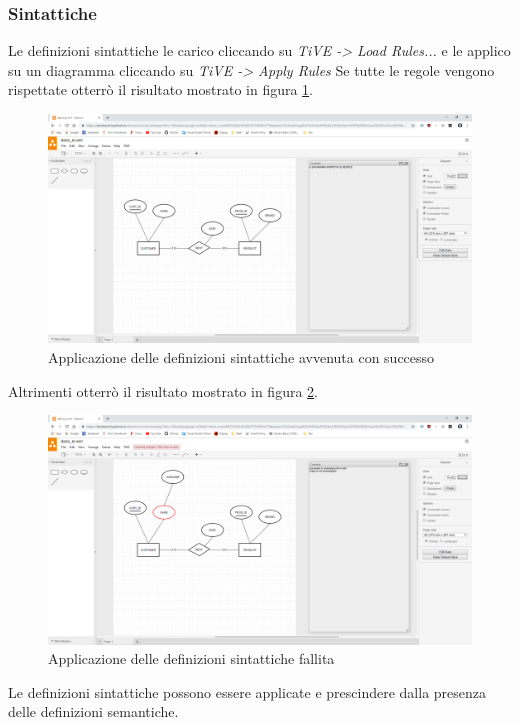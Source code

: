             \subsubsection{Sintattiche}
                Le definizioni sintattiche le carico cliccando su \textit{TiVE -> Load Rules...} e le applico su un diagramma cliccando su \textit{TiVE -> Apply Rules}
                \newline
                Se tutte le regole vengono rispettate otterrò il risultato mostrato in figura \ref{fig:syntaxOK}.
                \begin{figure}[htbp]
                    \centering
                    \includegraphics[scale=0.25]{Figure/drawse/syntax_rule_OK.PNG}
                    \caption{Applicazione delle definizioni sintattiche avvenuta con successo}
                    \label{fig:syntaxOK}
                \end{figure}
                \newline
                Altrimenti otterrò il risultato mostrato in figura \ref{fig:syntaxNO}.
                \begin{figure}[htbp]
                    \centering
                    \includegraphics[scale=0.25]{Figure/drawse/syntax_rule_FAIL.PNG}
                    \caption{Applicazione delle definizioni sintattiche fallita}
                    \label{fig:syntaxNO}
                \end{figure}
                \newline
                Le definizioni sintattiche possono essere applicate e prescindere dalla presenza delle definizioni semantiche.

